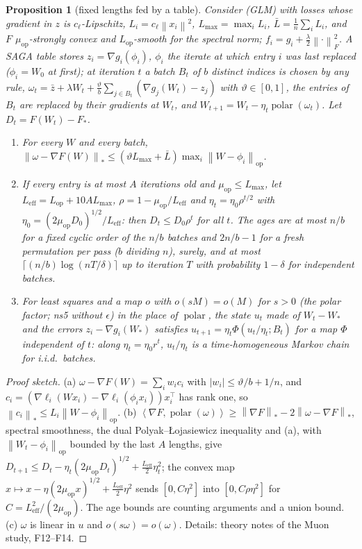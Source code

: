 \documentclass[10pt]{article}
\newtheorem{proposition}[theorem]{Proposition}
\theoremstyle{remark}
\newcommand{\norm}[1]{\left\|#1\right\|}
\newcommand{\nop}[1]{\left\|#1\right\|_{\mathrm{op}}}
\newcommand{\nnuc}[1]{\left\|#1\right\|_{*}}
\newcommand{\nF}[1]{\left\|#1\right\|_{F}}
\newcommand{\inner}[2]{\left\langle #1, #2 \right\rangle}
\newcommand{\abs}[1]{\left|#1\right|}
\newcommand{\polar}{\operatorname{polar}}
\newcommand{\Lop}{L_{\mathrm{op}}}
\newcommand{\muop}{\mu_{\mathrm{op}}}
\newcommand{\LEff}{L_{\mathrm{eff}}}
\begin{document}
\begin{proposition}[fixed lengths fed by a table]\label{prop:schedule}
Consider (GLM) with losses whose gradient in $z$ is $c_\ell$-Lipschitz, $L_i=c_\ell\norm{x_i}^2$, $L_{\max}=\max_iL_i$,
$\bar L=\frac1n\sum_iL_i$, and $F$ $\muop$-strongly convex and $\Lop$-smooth for the spectral norm; $f_i=g_i+\frac\lambda2\nF\cdot^2$.
A SAGA table stores $z_i=\nabla g_i(\phi_i)$, $\phi_i$ the iterate at which entry $i$ was last replaced ($\phi_i=W_0$ at first); at iteration $t$ a
batch $B_t$ of $b$ distinct indices is chosen by any rule, $\omega_t=\bar z+\lambda W_t+\frac\vartheta b\sum_{j\in
B_t}(\nabla g_j(W_t)-z_j)$ with $\vartheta\in[0,1]$, the entries of $B_t$ are replaced by their gradients at $W_t$, and
$W_{t+1}=W_t-\eta_t\polar(\omega_t)$. Let $D_t=F(W_t)-F_\ast$.
\begin{enumerate}[label=(\alph*),itemsep=0pt,topsep=2pt]
\item For every $W$ and every batch, $\nnuc{\omega-\nabla F(W)}\le(\vartheta L_{\max}+\bar L)\max_i\nop{W-\phi_i}$.
\item If every entry is at most $A$ iterations old and $\muop\le L_{\max}$, let $\LEff=\Lop+10AL_{\max}$,
$\rho=1-\muop/\LEff$ and $\eta_t=\eta_0\rho^{t/2}$ with $\eta_0=(2\muop D_0)^{1/2}/\LEff$: then $D_t\le D_0\rho^t$ for all
$t$. The ages are at most $n/b$ for a fixed cyclic order of the $n/b$ batches and $2n/b-1$ for a fresh permutation per
pass ($b$ dividing $n$), surely, and at most $\lceil(n/b)\log(nT/\delta)\rceil$ up to iteration $T$ with probability
$1-\delta$ for independent batches.
\item For least squares and a map $o$ with $o(sM)=o(M)$ for $s>0$ (the polar factor; ns5 without $\epsilon$) in the
place of $\polar$, the state $u_t$ made of $W_t-W_\ast$ and the errors $z_i-\nabla g_i(W_\ast)$ satisfies
$u_{t+1}=\eta_t\Phi(u_t/\eta_t;B_t)$ for a map $\Phi$ independent of $t$: along $\eta_t=\eta_0r^t$, $u_t/\eta_t$ is a
time-homogeneous Markov chain for i.i.d.\ batches.
\end{enumerate}
\end{proposition}
\begin{proof}[Proof sketch]
(a) $\omega-\nabla F(W)=\sum_iw_ic_i$ with $\abs{w_i}\le\vartheta/b+1/n$, and
$c_i=(\nabla\ell_i(Wx_i)-\nabla\ell_i(\phi_ix_i))x_i^\top$ has rank one, so $\nnuc{c_i}\le L_i\nop{W-\phi_i}$. (b)
$\inner{\nabla F}{\polar(\omega)}\ge\nnuc{\nabla F}-2\nnuc{\omega-\nabla F}$, spectral smoothness, the dual
Polyak--\L{}ojasiewicz inequality and (a), with $\nop{W_t-\phi_i}$ bounded by the last $A$ lengths, give
$D_{t+1}\le D_t-\eta_t(2\muop D_t)^{1/2}+\frac{\LEff}2\eta_t^2$; the convex map $x\mapsto x-\eta(2\muop x)^{1/2}+\frac{\LEff}2\eta^2$
sends $[0,C\eta^2]$ into $[0,C\rho\eta^2]$ for $C=\LEff^2/(2\muop)$. The age bounds are counting arguments and a union
bound. (c) $\omega$ is linear in $u$ and $o(s\omega)=o(\omega)$. Details: theory notes of the Muon study, F12--F14.
\end{proof}
\end{document}
